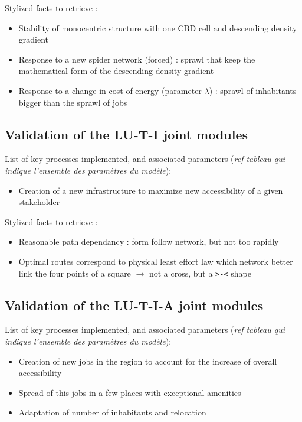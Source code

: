 Stylized facts to retrieve : 
\begin{itemize}
	\item Stability of monocentric structure with one CBD cell and descending density gradient
	\item Response to a new spider network (forced) : sprawl that keep the mathematical form of the descending density gradient
	\item Response to a change in cost of energy (parameter $\lambda$) : sprawl of inhabitants bigger than the sprawl of jobs
\end{itemize}





\subsection{Validation of the LU-T-I joint modules}

List of key processes implemented, and associated parameters (\textit{ref tableau qui indique l'ensemble des paramètres du modèle}):
\begin{itemize}
\item Creation of a new infrastructure to maximize new accessibility of a given stakeholder
\end{itemize}

Stylized facts to retrieve :
\begin{itemize}
	\item Reasonable path dependancy : form follow network, but not too rapidly
	\item Optimal routes correspond to physical least effort law which network better link the four points of a square $\rightarrow$ not a cross, but a \texttt{>-<} shape
\end{itemize}





\subsection{Validation of the LU-T-I-A joint modules}


List of key processes implemented, and associated parameters (\textit{ref tableau qui indique l'ensemble des paramètres du modèle}):
\begin{itemize}
\item Creation of new jobs in the region to account for the increase of overall accessibility
\item Spread of this jobs in a few places with exceptional amenities
\item Adaptation of number of inhabitants and relocation
\end{itemize}


